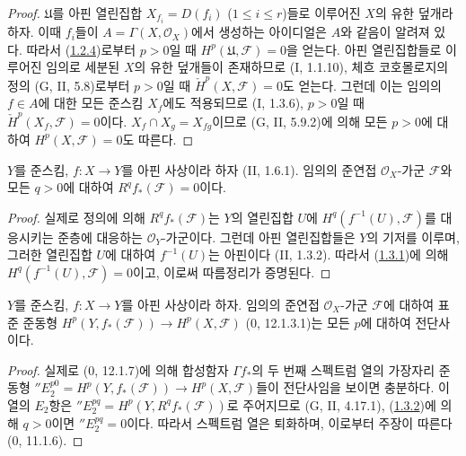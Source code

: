 \begin{proof}
$\mathfrak U$를 아핀 열린집합 $X_{f_i}=D(f_i)$ ($1\leq i\leq r$)들로
이루어진 $X$의 유한 덮개라 하자. 이때 $f_i$들이
$A=\Gamma(X,\mathcal O_X)$에서 생성하는 아이디얼은 $A$와 같음이 알려져
있다. 따라서 (\hyperref[III.1.2.4-fr]{1.2.4})로부터 $p>0$일 때
$H^p(\mathfrak U,\mathcal F)=0$을 얻는다. 아핀 열린집합들로 이루어진
임의로 세분된 $X$의 유한 덮개들이 존재하므로 (I, 1.1.10), 체흐
코호몰로지의 정의 (G, II, 5.8)로부터 $p>0$일 때
$\check H^p(X,\mathcal F)=0$도 얻는다. 그런데 이는 임의의 $f\in A$에
대한 모든 준스킴 $X_f$에도 적용되므로 (I, 1.3.6), $p>0$일 때
$\check H^p(X_f,\mathcal F)=0$이다. $X_f\cap X_g=X_{fg}$이므로
(G, II, 5.9.2)에 의해 모든 $p>0$에 대하여
$H^p(X,\mathcal F)=0$도 따른다.
\end{proof}

\begin{corollary}[1.3.2]
\label{III.1.3.2-fr}
$Y$를 준스킴, $f:X\to Y$를 아핀 사상이라 하자 (II, 1.6.1).
임의의 준연접 $\mathcal O_X$-가군 $\mathcal F$와 모든 $q>0$에 대하여
$R^qf_*(\mathcal F)=0$이다.
\end{corollary}

\begin{proof}
실제로 정의에 의해 $R^qf_*(\mathcal F)$는 $Y$의 열린집합 $U$에
$H^q(f^{-1}(U),\mathcal F)$를 대응시키는 준층에 대응하는
$\mathcal O_Y$-가군이다. 그런데 아핀 열린집합들은 $Y$의 기저를 이루며,
그러한 열린집합 $U$에 대하여 $f^{-1}(U)$는 아핀이다 (II, 1.3.2).
따라서 (\hyperref[III.1.3.1-fr]{1.3.1})에 의해
$H^q(f^{-1}(U),\mathcal F)=0$이고, 이로써 따름정리가 증명된다.
\end{proof}

\begin{corollary}[1.3.3]
\label{III.1.3.3-fr}
$Y$를 준스킴, $f:X\to Y$를 아핀 사상이라 하자. 임의의 준연접
$\mathcal O_X$-가군 $\mathcal F$에 대하여 표준 준동형
$H^p(Y,f_*(\mathcal F))\to H^p(X,\mathcal F)$ (0, 12.1.3.1)는 모든
$p$에 대하여 전단사이다.
\end{corollary}

\begin{proof}
실제로 (0, 12.1.7)에 의해 합성함자 $\Gamma f_*$의 두 번째 스펙트럼
열의 가장자리 준동형
$''E_2^{p0}=H^p(Y,f_*(\mathcal F))\to H^p(X,\mathcal F)$들이 전단사임을
보이면 충분하다. 이 열의 $E_2$항은
$''E_2^{pq}=H^p(Y,R^qf_*(\mathcal F))$로 주어지므로 (G, II, 4.17.1),
(\hyperref[III.1.3.2-fr]{1.3.2})에 의해 $q>0$이면
$''E_2^{pq}=0$이다. 따라서 스펙트럼 열은 퇴화하며, 이로부터 주장이
따른다 (0, 11.1.6).
\end{proof}

